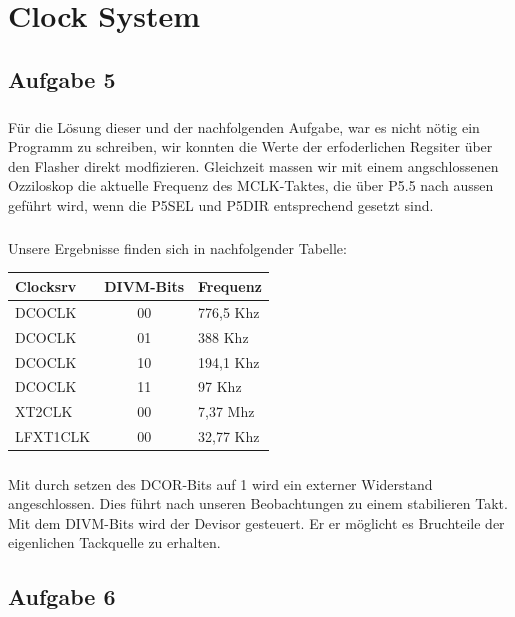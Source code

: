 \chapter{Clock System}

\section*{Aufgabe 5}

\paragraph*{}
Für die Lösung dieser und der nachfolgenden Aufgabe, war es nicht nötig ein Programm zu schreiben, wir konnten die Werte der erfoderlichen Regsiter über den Flasher direkt modfizieren. Gleichzeit massen wir mit einem angschlossenen Ozziloskop die aktuelle Frequenz des MCLK-Taktes, die über P5.5 nach aussen geführt wird, wenn die P5SEL und P5DIR entsprechend gesetzt sind.

\paragraph*{}
Unsere Ergebnisse finden sich in nachfolgender Tabelle: \\

\begin{tabular}{ p{4cm} | c | p{4cm} }\hline \hline
Clocksrv & DIVM-Bits & Frequenz \\ \hline
DCOCLK & 00 & 776,5 Khz \\ \cline{2-3}
DCOCLK & 01 & 388 Khz \\ \cline{2-3}
DCOCLK & 10 & 194,1 Khz \\ \cline{2-3}
DCOCLK & 11 & 97 Khz \\ \hline
XT2CLK & 00 & 7,37 Mhz \\ \hline
LFXT1CLK & 00 & 32,77 Khz \\ \hline
\end{tabular}

\paragraph*{}
Mit durch setzen des DCOR-Bits auf 1 wird ein externer Widerstand angeschlossen. Dies führt nach unseren Beobachtungen zu einem stabilieren Takt. Mit dem DIVM-Bits wird der Devisor gesteuert. Er er möglicht es Bruchteile der eigenlichen Tackquelle zu erhalten. 

\section*{Aufgabe 6}

